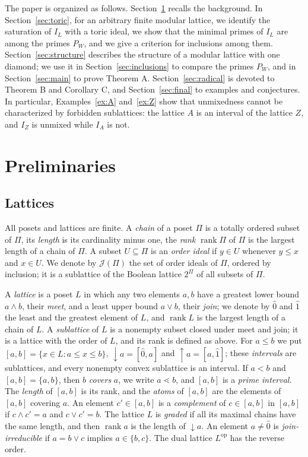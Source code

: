 \documentclass{amsart}
\theoremstyle{definition}
\DeclareMathOperator{\rk}{rank}
\begin{document}
The paper is organized as follows. Section~\ref{sec:prelim} recalls the background. In Section~\ref{sec:toric}, for an arbitrary finite modular lattice, we identify the saturation of $I_L$ with a toric ideal, we show that the minimal primes of $I_L$ are among the primes $P_W$, and we give a criterion for inclusions among them. Section~\ref{sec:structure} describes the structure of a modular lattice with one diamond; we use it in Section~\ref{sec:inclusions} to compare the primes $P_W$, and in Section~\ref{sec:main} to prove Theorem A. Section~\ref{sec:radical} is devoted to Theorem B and Corollary C, and Section~\ref{sec:final} to examples and conjectures. In particular, Examples~\ref{ex:A} and~\ref{ex:Z} show that unmixedness cannot be characterized by forbidden sublattices: the lattice $A$ is an interval of the lattice $Z$, and $I_Z$ is unmixed while $I_A$ is not.


\section{Preliminaries}\label{sec:prelim}

\subsection{Lattices}
All posets and lattices are finite. A \emph{chain} of a poset $\Pi$ is a totally ordered subset of $\Pi$, its \emph{length} is its cardinality minus one, the \emph{rank} $\rk\Pi$ of $\Pi$ is the largest length of a chain of $\Pi$. A subset $U\subseteq\Pi$ is an \emph{order ideal} if $y\in U$ whenever $y\le x$ and $x\in U$. We denote by $\mathcal J(\Pi)$ the set of order ideals of $\Pi$, ordered by inclusion; it is a sublattice of the Boolean lattice $2^\Pi$ of all subsets of $\Pi$.

A \emph{lattice} is a poset $L$ in which any two elements $a,b$ have a greatest lower bound $a\wedge b$, their \emph{meet}, and a least upper bound $a\vee b$, their \emph{join}; we denote by $\hat0$ and $\hat1$ the least and the greatest element of $L$, and $\rk L$ is the largest length of a chain of $L$. A \emph{sublattice} of $L$ is a nonempty subset closed under meet and join; it is a lattice with the order of $L$, and its rank is defined as above. For $a\le b$ we put $[a,b]=\{x\in L:a\le x\le b\}$, ${\downarrow}a=[\hat0,a]$ and ${\uparrow}a=[a,\hat1]$; these \emph{intervals} are sublattices, and every nonempty convex sublattice is an interval. If $a<b$ and $[a,b]=\{a,b\}$, then $b$ \emph{covers} $a$, we write $a\lessdot b$, and $[a,b]$ is a \emph{prime interval}. The \emph{length} of $[a,b]$ is its rank, and the \emph{atoms} of $[a,b]$ are the elements of $[a,b]$ covering $a$. An element $c'\in[a,b]$ is a \emph{complement} of $c\in[a,b]$ in $[a,b]$ if $c\wedge c'=a$ and $c\vee c'=b$. The lattice $L$ is \emph{graded} if all its maximal chains have the same length, and then $\rk a$ is the length of ${\downarrow}a$. An element $a\ne\hat0$ is \emph{join-irreducible} if $a=b\vee c$ implies $a\in\{b,c\}$. The dual lattice $L^{\mathrm{op}}$ has the reverse order.
\end{document}
